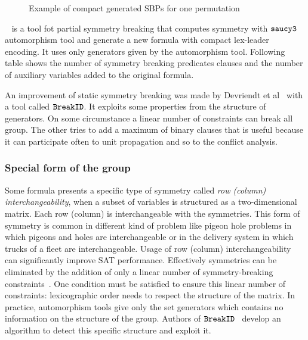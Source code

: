  \begin{figure}[!htbp]
 
 \caption{Example of compact generated SBPs for one permutation}
 \label{fig:esbp_compact_gen}
\end{figure}

\shatter~\cite{aloul06} is a tool fot partial symmetry breaking that computes symmetry with $\texttt{saucy3}$ automorphism tool and generate a new formula with compact lex-leader encoding. It uses only generators given by the automorphism tool. Following table shows the number of symmetry breaking predicates clauses and the
number of auxiliary variables added to the original formula.



%

An improvement of static symmetry breaking was made by Devriendt et al~\cite{devriendt2016improved} with a tool 
called $\texttt{BreakID}$. It exploits some properties from the structure of generators. On some circumstance 
a linear number of constraints can break all group. The other tries to add a maximum of binary clauses that 
is useful because it can participate often to unit propagation and so to the conflict analysis.

\subsubsection{Special form of the group} \label{sec:matrix-sbp}
Some formula presents a specific type of symmetry called \emph{row (column) interchangeability}, when a
subset of variables is structured as a two-dimensional matrix. Each row (column) is interchangeable
with the symmetries. 
This form of symmetry is common in different kind of problem like pigeon hole problems in which
pigeons and holes are interchangeable or in the delivery system in which trucks of a fleet are interchangeable.
Usage of row (column) interchangeability can significantly improve SAT performance. 
Effectively symmetries can be eliminated by the addition 
of only a linear number of symmetry-breaking constraints~\cite{flener2002breaking}. 
One condition must be satisfied to ensure this linear number of constraints:
lexicographic order needs to respect the structure of the matrix.
In practice, automorphism tools give only the set generators which contains no information on
the structure of the group. 
Authors of $\texttt{BreakID}$~\cite{devriendt2016improved} develop an algorithm to detect this specific 
structure and exploit it.

